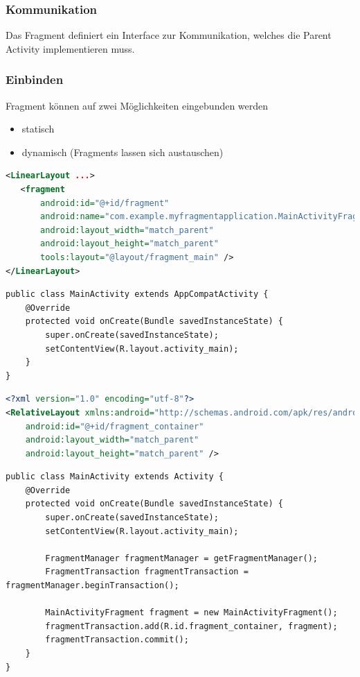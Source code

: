 \subsubsection{Kommunikation}
Das Fragment definiert ein Interface zur Kommunikation, welches die Parent Activity implementieren muss.

\subsubsection{Einbinden}
Fragment können auf zwei Möglichkeiten eingebunden werden
\begin{itemize}
	\item statisch
	\item dynamisch (Fragments lassen sich austauschen)
\end{itemize}

\begin{lstlisting}[caption=Statisches Einbinden eines Fragment in XML, language=XML]
<LinearLayout ...>
   <fragment
	   android:id="@+id/fragment"
	   android:name="com.example.myfragmentapplication.MainActivityFragment"
	   android:layout_width="match_parent"
	   android:layout_height="match_parent"
	   tools:layout="@layout/fragment_main" />
</LinearLayout>
\end{lstlisting}
\begin{lstlisting}[caption=Statisches Einbinden eines Fragment im Code]
public class MainActivity extends AppCompatActivity {
	@Override
	protected void onCreate(Bundle savedInstanceState) {
		super.onCreate(savedInstanceState);
		setContentView(R.layout.activity_main);
	}
}
\end{lstlisting}

\begin{lstlisting}[caption=Dynamisches Einbinden eines Fragment in XML, language=XML]
<?xml version="1.0" encoding="utf-8"?>
<RelativeLayout xmlns:android="http://schemas.android.com/apk/res/android"
	android:id="@+id/fragment_container"
	android:layout_width="match_parent"
	android:layout_height="match_parent" />
\end{lstlisting}


\begin{lstlisting}[caption=Dynamisches Einbinden eines Fragment im Code]
public class MainActivity extends Activity {
	@Override
	protected void onCreate(Bundle savedInstanceState) {
		super.onCreate(savedInstanceState);
		setContentView(R.layout.activity_main);
	
		FragmentManager fragmentManager = getFragmentManager();
		FragmentTransaction fragmentTransaction = fragmentManager.beginTransaction();
	
		MainActivityFragment fragment = new MainActivityFragment();
		fragmentTransaction.add(R.id.fragment_container, fragment);
		fragmentTransaction.commit();
	}
}
\end{lstlisting}


